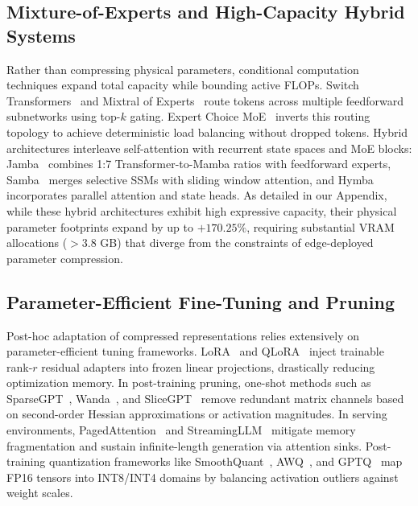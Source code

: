 \subsection{Mixture-of-Experts and High-Capacity Hybrid Systems}
Rather than compressing physical parameters, conditional computation techniques expand total capacity while bounding active FLOPs. Switch Transformers~\cite{fedus2022switch} and Mixtral of Experts~\cite{jiang2024mixtral} route tokens across multiple feedforward subnetworks using top-$k$ gating. Expert Choice MoE~\cite{zhou2022expertchoice} inverts this routing topology to achieve deterministic load balancing without dropped tokens. Hybrid architectures interleave self-attention with recurrent state spaces and MoE blocks: Jamba~\cite{lieber2024jamba} combines 1:7 Transformer-to-Mamba ratios with feedforward experts, Samba~\cite{ren2024samba} merges selective SSMs with sliding window attention, and Hymba~\cite{dong2024hymba} incorporates parallel attention and state heads. As detailed in our Appendix, while these hybrid architectures exhibit high expressive capacity, their physical parameter footprints expand by up to $+170.25\%$, requiring substantial VRAM allocations ($>3.8$ GB) that diverge from the constraints of edge-deployed parameter compression.

\subsection{Parameter-Efficient Fine-Tuning and Pruning}
Post-hoc adaptation of compressed representations relies extensively on parameter-efficient tuning frameworks. LoRA~\cite{hu2022lora} and QLoRA~\cite{dettmers2023qlora} inject trainable rank-$r$ residual adapters into frozen linear projections, drastically reducing optimization memory. In post-training pruning, one-shot methods such as SparseGPT~\cite{frantar2023sparsegpt}, Wanda~\cite{sun2023wanda}, and SliceGPT~\cite{ashkboos2024slicegpt} remove redundant matrix channels based on second-order Hessian approximations or activation magnitudes. In serving environments, PagedAttention~\cite{kwon2023pagedattention} and StreamingLLM~\cite{xiao2024streamingllm} mitigate memory fragmentation and sustain infinite-length generation via attention sinks. Post-training quantization frameworks like SmoothQuant~\cite{xiao2023smoothquant}, AWQ~\cite{lin2024awq}, and GPTQ~\cite{frantar2023gptq} map FP16 tensors into INT8/INT4 domains by balancing activation outliers against weight scales.

